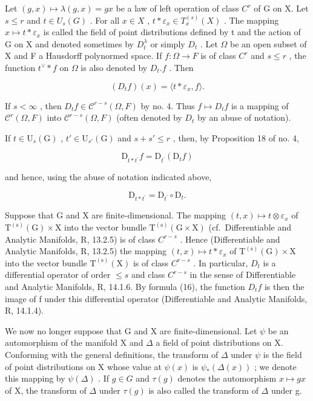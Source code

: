 Let \((g,x)\mapsto\lambda(g,x)=gx\) be a law of left operation of class \(C^{r}\) of G on X. Let \(s\leqslant r\) and \(t\in U_{s}(G)\) . For all \(x\in X\) , \(t*\varepsilon_{x}\in T_{x}^{(s)}(X)\) . The mapping \(x\mapsto t*\varepsilon_{x}\) is called the field of point distributions defined by t and the action of G on X and denoted sometimes by \(D_{t}^{\lambda}\) or simply \(D_{t}\) . Let \(\Omega\) be an open subset of X and F a Hausdorff polynormed space. If \(f\colon\Omega\to F\) is of class \(C^{r}\) and \(s\leqslant r\) , the function \(t^{\vee}\ast f\) on \(\Omega\) is also denoted by \(D_{t}.f\) . Then

\[
(D _ {t} f) (x) = \langle t * \varepsilon_ {x}, f \rangle .\tag{16}
\]

If \(s < \infty\) , then \(D_t f \in \mathcal{C}^{r-s}(\Omega, F)\) by no. 4. Thus \(f \mapsto D_t f\) is a mapping of \(\mathcal{C}^r(\Omega, F)\) into \(\mathcal{C}^{r-s}(\Omega, F)\) (often denoted by \(D_t\) by an abuse of notation).

If \(t \in \mathrm{U}_s(\mathrm{G})\) , \(t' \in \mathrm{U}_{s'}(\mathrm{G})\) and \(s + s' \leqslant r\) , then, by Proposition 18 of no. 4,

\[
\mathrm{D} _ {t * t ^ {\prime}} f = \mathrm{D} _ {t ^ {\prime}} (\mathrm{D} _ {t} f)\tag{17}
\]

and hence, using the abuse of notation indicated above,

\[
\mathrm{D} _ {t * t ^ {\prime}} = \mathrm{D} _ {t ^ {\prime}} \circ \mathrm{D} _ {t}.\tag{18}
\]

Suppose that G and X are finite-dimensional. The mapping \((t, x) \mapsto t \otimes \varepsilon_{x}\) of \(\mathrm{T}^{(\mathrm{s})}(\mathrm{G}) \times \mathrm{X}\) into the vector bundle \(\mathrm{T}^{(\mathrm{s})}(\mathrm{G} \times \mathrm{X})\) (cf.~Differentiable and Analytic Manifolds, R, 13.2.5) is of class \(C^{r-s}\) . Hence (Differentiable and Analytic Manifolds, R, 13.2.5) the mapping \((t, x) \mapsto t * \varepsilon_{x}\) of \(\mathrm{T}^{(\mathrm{s})}(\mathrm{G}) \times \mathrm{X}\) into the vector bundle \(\mathrm{T}^{(\mathrm{s})}(\mathrm{X})\) is of class \(C^{r-s}\) . In particular, \(D_{t}\) is a differential operator of order \(\leqslant s\) and class \(C^{r-s}\) in the sense of Differentiable and Analytic Manifolds, R, 14.1.6. By formula (16), the function \(D_{t}f\) is then the image of f under this differential operator (Differentiable and Analytic Manifolds, R, 14.1.4).

We now no longer suppose that G and X are finite-dimensional. Let \(\psi\) be an automorphism of the manifold X and \(\Delta\) a field of point distributions on X. Conforming with the general definitions, the transform of \(\Delta\) under \(\psi\) is the field of point distributions on X whose value at \(\psi(x)\) is \(\psi_{*}(\Delta(x))\) ; we denote this mapping by \(\psi(\Delta)\) . If \(g \in G\) and \(\tau(g)\) denotes the automorphism \(x \mapsto gx\) of X, the transform of \(\Delta\) under \(\tau(g)\) is also called the transform of \(\Delta\) under g.

